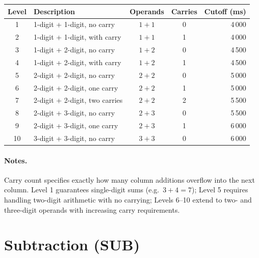 \documentclass[11pt]{article}
\begin{document}
\begin{longtable}{@{}clccr@{}}
\toprule
\textbf{Level} & \textbf{Description} & \textbf{Operands} & \textbf{Carries} & \textbf{Cutoff (ms)} \\
\midrule
\endhead
1  & 1-digit + 1-digit, no carry          & $1 + 1$ & 0 & 4\,000 \\
2  & 1-digit + 1-digit, with carry        & $1 + 1$ & 1 & 4\,000 \\
3  & 1-digit + 2-digit, no carry          & $1 + 2$ & 0 & 4\,500 \\
4  & 1-digit + 2-digit, with carry        & $1 + 2$ & 1 & 4\,500 \\
5  & 2-digit + 2-digit, no carry          & $2 + 2$ & 0 & 5\,000 \\
6  & 2-digit + 2-digit, one carry         & $2 + 2$ & 1 & 5\,000 \\
7  & 2-digit + 2-digit, two carries       & $2 + 2$ & 2 & 5\,500 \\
8  & 2-digit + 3-digit, no carry          & $2 + 3$ & 0 & 5\,500 \\
9  & 2-digit + 3-digit, one carry         & $2 + 3$ & 1 & 6\,000 \\
10 & 3-digit + 3-digit, no carry          & $3 + 3$ & 0 & 6\,000 \\
\bottomrule
\end{longtable}

\paragraph{Notes.}
Carry count specifies exactly how many column additions overflow into the next column.
Level 1 guarantees single-digit sums (e.g.\ $3 + 4 = 7$); Level 5 requires handling two-digit
arithmetic with no carrying; Levels 6–10 extend to two- and three-digit operands with
increasing carry requirements.

\section{Subtraction (SUB)}
\end{document}

